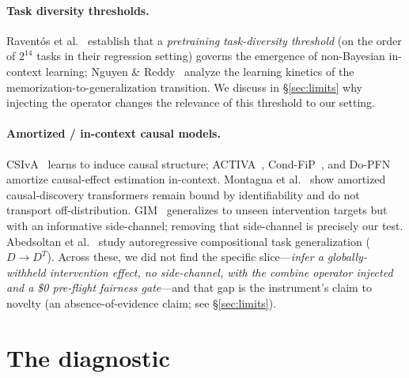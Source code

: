 \documentclass[11pt]{article}
\begin{document}
\paragraph{Task diversity thresholds.} Raventós et al.~\cite{raventos2023pretraining} establish that a
\emph{pretraining task-diversity threshold} (on the order of $2^{14}$ tasks in their regression setting)
governs the emergence of non-Bayesian in-context learning; Nguyen \& Reddy~\cite{nguyen2024kinetics} analyze
the learning kinetics of the memorization-to-generalization transition. We discuss in \S\ref{sec:limits} why
injecting the operator changes the relevance of this threshold to our setting.

\paragraph{Amortized / in-context causal models.} CSIvA~\cite{ke2023csiva} learns to induce causal
structure; ACTIVA~\cite{sauter2025activa}, Cond-FiP~\cite{mahajan2025condfip}, and
Do-PFN~\cite{robertson2025dopfn} amortize causal-effect estimation in-context. Montagna et
al.~\cite{montagna2025demystify} show amortized causal-discovery transformers remain bound by
identifiability and do not transport off-distribution. GIM~\cite{schneider2024gim} generalizes to unseen
intervention targets but with an informative side-channel; removing that side-channel is precisely our
test. Abedsoltan et al.~\cite{abedsoltan2025taskgen} study autoregressive compositional task generalization
($D\!\to\!D^{T}$). Across these, we did not find the specific slice---\emph{infer a globally-withheld
intervention effect, no side-channel, with the combine operator injected and a \$0 pre-flight fairness
gate}---and that gap is the instrument's claim to novelty (an absence-of-evidence claim; see
\S\ref{sec:limits}).

\section{The diagnostic}\label{sec:method}
\end{document}
